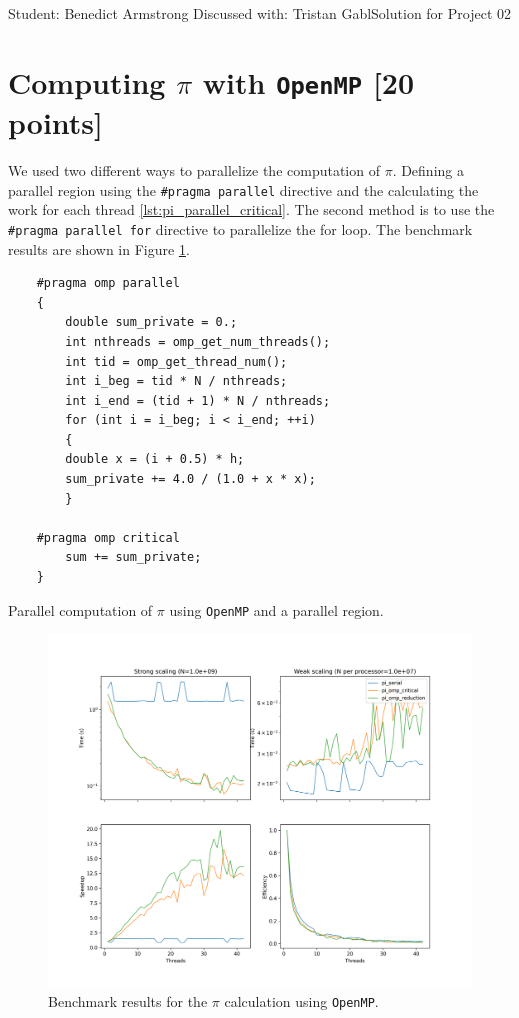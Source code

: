 \documentclass[unicode,11pt,a4paper,oneside,numbers=endperiod,openany]{scrartcl}
\begin{document}
\setassignment
{}

{Student: Benedict Armstrong}
{Discussed with: Tristan Gabl}{Solution for Project 02}{}
\newline


\section{Computing $\pi$ with \texttt{OpenMP} [20 points]}

We used two different ways to parallelize the computation of $\pi$. Defining a parallel region using the \texttt{\#pragma parallel} directive and the calculating the work for each thread \ref{lst:pi_parallel_critical}. The second method is to use the \texttt{\#pragma parallel for} directive to parallelize the for loop. The benchmark results are shown in Figure \ref{fig:pi_benchmark}.

\begin{listing}[h!t]
    \begin{verbatim}
    #pragma omp parallel
    {
        double sum_private = 0.;
        int nthreads = omp_get_num_threads();
        int tid = omp_get_thread_num();
        int i_beg = tid * N / nthreads;
        int i_end = (tid + 1) * N / nthreads;
        for (int i = i_beg; i < i_end; ++i)
        {
        double x = (i + 0.5) * h;
        sum_private += 4.0 / (1.0 + x * x);
        }

    #pragma omp critical
        sum += sum_private;
    }
    \end{verbatim}
    \caption{Parallel computation of $\pi$ using \texttt{OpenMP} and a parallel region.}
    \label{lst:pi_parallel_critical}
\end{listing}

\begin{figure}[h]
    \centering
    \includegraphics[width=\textwidth]{../code/pi/benchmark.png}
    \caption{Benchmark results for the $\pi$ calculation using \texttt{OpenMP}.}
    \label{fig:pi_benchmark}
\end{figure}
\end{document}
